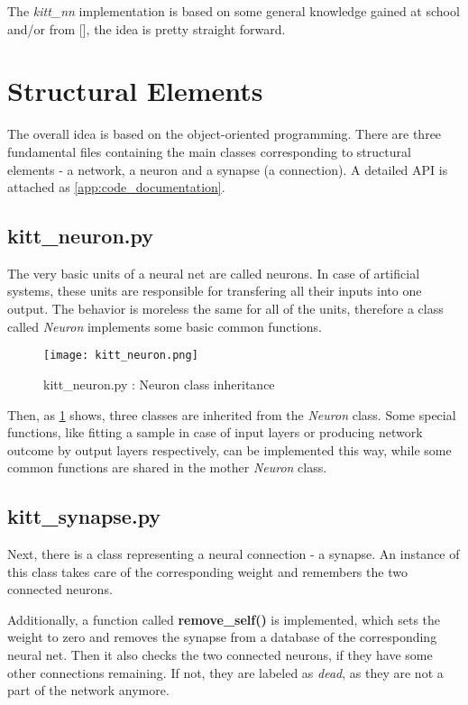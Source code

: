 The \textit{kitt\_nn} implementation is based on some general knowledge gained at school and/or from [], the idea is pretty straight forward.

\section{Structural Elements} \label{sec:structural_elements}
The overall idea is based on the object-oriented programming. There are three fundamental files containing the main classes corresponding to structural elements - a network, a neuron and a synapse (a connection). A detailed API is attached as \cref{app:code_documentation}.

\subsection*{kitt\_neuron.py} \label{ssec:kitt_neuron}
The very basic units of a neural net are called neurons. In case of artificial systems, these units are responsible for transfering all their inputs into one output. The behavior is moreless the same for all of the units, therefore a class called \textit{Neuron} implements some basic common functions.

\begin{figure}[H]
  \centering
  \texttt{[image: kitt\_neuron.png]}
  \caption{kitt\_neuron.py : Neuron class inheritance}
  \label{img:kitt_neuron}
\end{figure}

Then, as \cref{img:kitt_neuron} shows, three classes are inherited from the \textit{Neuron} class. Some special functions, like fitting a sample in case of input layers or producing network outcome by output layers respectively, can be implemented this way, while some common functions are shared in the mother \textit{Neuron} class.

\subsection*{kitt\_synapse.py} \label{ssec:kitt_synapse}
Next, there is a class representing a neural connection - a synapse. An instance of this class takes care of the corresponding weight and remembers the two connected neurons. 

Additionally, a function called \textbf{remove\_self()} is implemented, which sets the weight to zero and removes the synapse from a database of the corresponding neural net. Then it also checks the two connected neurons, if they have some other connections remaining. If not, they are labeled as \textit{dead}, as they are not a part of the network anymore.

